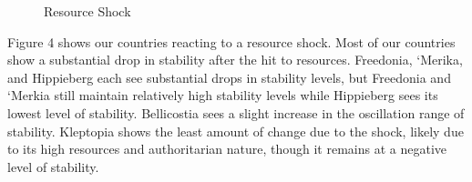 \documentclass[12pt]{article}
\begin{document}
\begin{spacing}{1.5}
\begin{figure}[htb]
\centering 
{} 
\caption{Resource Shock}
\end{figure}

Figure 4 shows our countries reacting to a resource shock. Most of our countries show a substantial drop in stability after the hit to resources. Freedonia, `Merika, and Hippieberg each see substantial drops in stability levels, but Freedonia and `Merkia still maintain relatively high stability levels while Hippieberg sees its lowest level of stability. Bellicostia sees a slight increase in the oscillation range of stability. Kleptopia shows the least amount of change due to the shock, likely due to its high resources and authoritarian nature, though it remains at a negative level of stability. 


\end{spacing}
\end{document}
